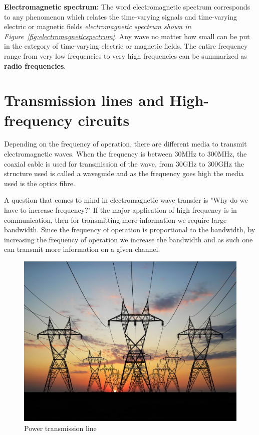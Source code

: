 \textbf{Electromagnetic spectrum:} The word electromagnetic spectrum corresponds to any phenomenon which relates the time-varying signals and time-varying electric or magnetic fields \textit{electromagnetic spectrum shown in Figure~\ref{fig:electromagneticspectrum}}. Any wave no matter how small can be put in the category of time-varying electric or magnetic fields. The entire frequency range from very low frequencies to very high frequencies can be summarized as \textbf{radio frequencies}.\\

\section{Transmission lines and High-frequency circuits}

Depending on the frequency of operation, there are different media to transmit electromagnetic waves. When the frequency is between 30MHz to 300MHz, the coaxial cable is used for transmission of the wave, from 30GHz to 300GHz the structure used is called a waveguide and as the frequency goes high the media used is the optics fibre.

A question that comes to mind in electromagnetic wave transfer is "Why do we have to increase frequency?" If the major application of high frequency is in communication, then for transmitting more information we require large bandwidth. Since the frequency of operation is proportional to the bandwidth, by increasing the frequency of operation we increase the bandwidth and as such one can transmit more information on a given channel.
\begin{figure}[h]
\centering
\includegraphics[scale=0.1]{./graphics/transmission2}
\caption{Power transmission line}
\end{figure}

